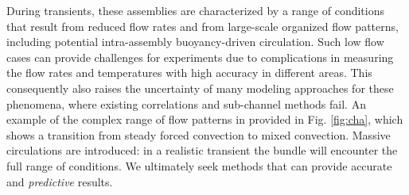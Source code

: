During transients, these assemblies are characterized by a range of conditions
that result from reduced flow rates and from large-scale organized flow
patterns, including potential intra-assembly buoyancy-driven circulation. Such
low flow cases can provide challenges for experiments due to complications in
measuring the flow rates and temperatures with high accuracy in different
areas. This consequently also raises the uncertainty of many modeling
approaches for these phenomena, where existing correlations and sub-channel
methods fail. An example of the complex range of flow patterns in provided in
Fig. \ref{fig:cha}, which shows a transition from steady forced convection to
mixed convection.  Massive circulations are introduced: in a realistic
transient the bundle will encounter the full range of conditions. We ultimately
seek methods that can provide accurate and \textit{predictive} results.






